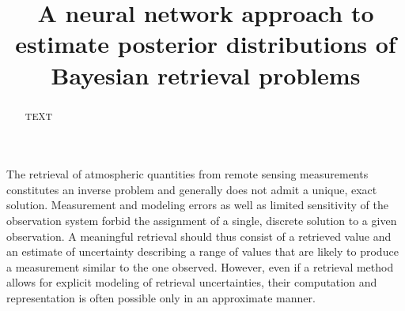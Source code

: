 \documentclass[journal abbreviation, manuscript]{copernicus}
\begin{document}
\title{A neural network approach to estimate posterior distributions of Bayesian retrieval problems}












\received{}
\pubdiscuss{} %
\revised{}
\accepted{}
\published{}




\maketitle



\begin{abstract}
TEXT
\end{abstract}




\introduction  %

The retrieval of atmospheric quantities from remote sensing measurements
constitutes an inverse problem and generally does not admit a unique, exact
solution. Measurement and modeling errors as well as limited sensitivity of the
observation system forbid the assignment of a single, discrete solution to a
given observation. A meaningful retrieval should thus consist of a retrieved
value and an estimate of uncertainty describing a range of values that are
likely to produce a measurement similar to the one observed. However, even
if a retrieval method allows for explicit modeling of retrieval uncertainties,
their computation and representation is often possible only in an approximate
manner.
\end{document}
